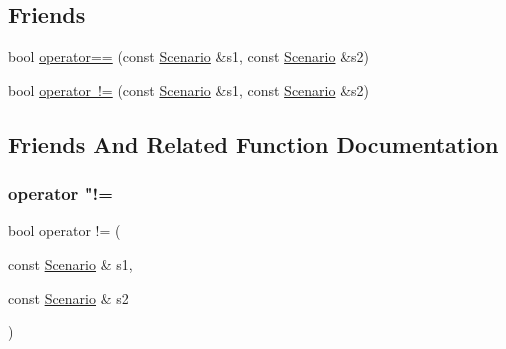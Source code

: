 \subsection*{Friends}
\begin{DoxyCompactItemize}
\item 
bool \mbox{\hyperlink{structdisplace_1_1commons_1_1_scenario_a3634b052f14daf3d420ae3666e38b7ab}{operator==}} (const \mbox{\hyperlink{structdisplace_1_1commons_1_1_scenario}{Scenario}} \&s1, const \mbox{\hyperlink{structdisplace_1_1commons_1_1_scenario}{Scenario}} \&s2)
\item 
bool \mbox{\hyperlink{structdisplace_1_1commons_1_1_scenario_acb126d18f454dc7769059a457ac0878f}{operator !=}} (const \mbox{\hyperlink{structdisplace_1_1commons_1_1_scenario}{Scenario}} \&s1, const \mbox{\hyperlink{structdisplace_1_1commons_1_1_scenario}{Scenario}} \&s2)
\end{DoxyCompactItemize}


\subsection{Friends And Related Function Documentation}
\mbox{\label{structdisplace_1_1commons_1_1_scenario_acb126d18f454dc7769059a457ac0878f}} 
\subsubsection{\texorpdfstring{operator "!=}{operator !=}}
{\footnotesize\ttfamily bool operator != (\begin{DoxyParamCaption}\item[{const \mbox{\hyperlink{structdisplace_1_1commons_1_1_scenario}{Scenario}} \&}]{s1,  }\item[{const \mbox{\hyperlink{structdisplace_1_1commons_1_1_scenario}{Scenario}} \&}]{s2 }\end{DoxyParamCaption})\hspace{0.3cm}{\ttfamily [friend]}}

\mbox{\label{structdisplace_1_1commons_1_1_scenario_a3634b052f14daf3d420ae3666e38b7ab}} 
